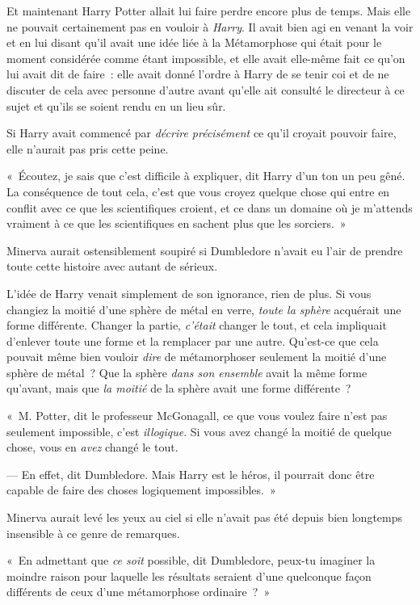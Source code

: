 Et maintenant Harry Potter allait lui faire perdre encore plus de temps.
Mais elle ne pouvait certainement pas en vouloir à \emph{Harry}.
Il avait bien agi en venant la voir et en lui disant qu'il avait une idée liée à la Métamorphose qui était pour le moment considérée comme étant impossible, et elle avait elle-même fait ce qu'on lui avait dit de faire~: elle avait donné l'ordre à Harry de se tenir coi et de ne discuter de cela avec personne d'autre avant qu'elle ait consulté le directeur à ce sujet et qu'ils se soient rendu en un lieu sûr.

Si Harry avait commencé par \emph{décrire précisément} ce qu'il croyait pouvoir faire, elle n'aurait pas pris cette peine.

«~Écoutez, je sais que c'est difficile à expliquer, dit Harry d'un ton un peu gêné.
La conséquence de tout cela, c'est que vous croyez quelque chose qui entre en conflit avec ce que les scientifiques croient, et ce dans un domaine où je m'attends vraiment à ce que les scientifiques en sachent plus que les sorciers.~»

Minerva aurait ostensiblement soupiré si Dumbledore n'avait eu l'air de prendre toute cette histoire avec autant de sérieux.

L'idée de Harry venait simplement de son ignorance, rien de plus.
Si vous changiez la moitié d'une sphère de métal en verre, \emph{toute la sphère} acquérait une forme différente.
Changer la partie, \emph{c'était} changer le tout, et cela impliquait d'enlever toute une forme et la remplacer par une autre.
Qu'est-ce que cela pouvait même bien vouloir \emph{dire} de métamorphoser seulement la moitié d'une sphère de métal~?
Que la sphère \emph{dans son ensemble} avait la même forme qu'avant, mais que \emph{la moitié} de la sphère avait une forme différente~?

«~M. Potter, dit le professeur McGonagall, ce que vous voulez faire n'est pas seulement impossible, c'est \emph{illogique}.
Si vous avez changé la moitié de quelque chose, vous en \emph{avez} changé le tout.

--- En effet, dit Dumbledore.
Mais Harry est le héros, il pourrait donc être capable de faire des choses logiquement impossibles.~»

Minerva aurait levé les yeux au ciel si elle n'avait pas été depuis bien longtemps insensible à ce genre de remarques.

«~En admettant que \emph{ce soit} possible, dit Dumbledore, peux-tu imaginer la moindre raison pour laquelle les résultats seraient d'une quelconque façon différents de ceux d'une métamorphose ordinaire~?~»

